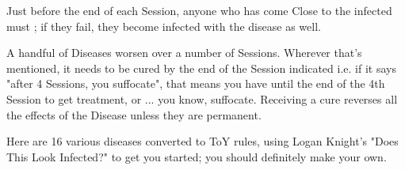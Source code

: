 \newpage


Just before the end of each Session, anyone who has come Close to the infected must \RSTRY{\VIG}; if they fail, they become infected with the disease as well.

A handful of Diseases worsen over a number of Sessions.  Wherever that's mentioned, it needs to be cured by the end of the Session indicated i.e.  if it says "after 4 Sessions, you suffocate", that means you have until the end of the 4th Session to get treatment, or ... you know, suffocate.  Receiving a cure reverses all the effects of the Disease unless they are permanent.

Here are 16 various diseases converted to ToY rules, using Logan Knight's "Does This Look Infected?" to get you started; you should definitely make your own.


